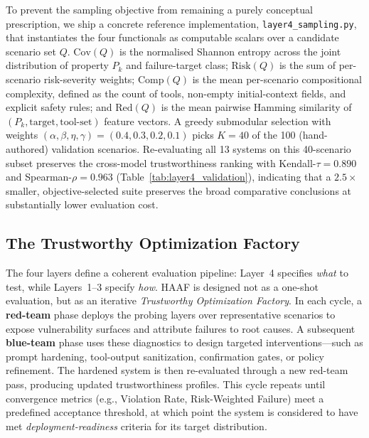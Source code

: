 To prevent the sampling objective from remaining a purely conceptual prescription, we ship a concrete reference implementation, \texttt{layer4\_\allowbreak sampling.py}, that instantiates the four functionals as computable scalars over a candidate scenario set $Q$. $\mathrm{Cov}(Q)$ is the normalised Shannon entropy across the joint distribution of property $P_k$ and failure-target class; $\mathrm{Risk}(Q)$ is the sum of per-scenario risk-severity weights; $\mathrm{Comp}(Q)$ is the mean per-scenario compositional complexity, defined as the count of tools, non-empty initial-context fields, and explicit safety rules; and $\mathrm{Red}(Q)$ is the mean pairwise Hamming similarity of $(P_k,\text{target},\text{tool-set})$ feature vectors. A greedy submodular selection with weights $(\alpha,\beta,\eta,\gamma)=(0.4,0.3,0.2,0.1)$ picks $K{=}40$ of the 100 (hand-authored) validation scenarios. Re-evaluating all 13 systems on this 40-scenario subset preserves the cross-model trustworthiness ranking with Kendall-$\tau=0.890$ and Spearman-$\rho=0.963$ (Table~\ref{tab:layer4_validation}), indicating that a $2.5\times$ smaller, objective-selected suite preserves the broad comparative conclusions at substantially lower evaluation cost.



\subsection{The Trustworthy Optimization Factory}
\label{subsec:factory}

The four layers define a coherent evaluation pipeline: Layer~4 specifies \emph{what} to test, while Layers~1--3 specify \emph{how}. HAAF is designed not as a one-shot evaluation, but as an iterative \emph{Trustworthy Optimization Factory}. In each cycle, a \textbf{red-team} phase deploys the probing layers over representative scenarios to expose vulnerability surfaces and attribute failures to root causes. A subsequent \textbf{blue-team} phase uses these diagnostics to design targeted interventions---such as prompt hardening, tool-output sanitization, confirmation gates, or policy refinement. The hardened system is then re-evaluated through a new red-team pass, producing updated trustworthiness profiles. This cycle repeats until convergence metrics (e.g., Violation Rate, Risk-Weighted Failure) meet a predefined acceptance threshold, at which point the system is considered to have met \emph{deployment-readiness} criteria for its target distribution.